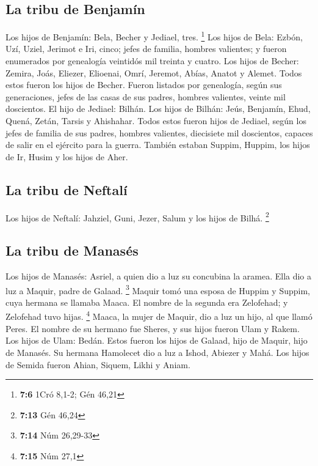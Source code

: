 \begin{paracol}{2}
\hypertarget{la-tribu-de-benjamuxedn}{%
\subsection{La tribu de Benjamín}\label{la-tribu-de-benjamuxedn}}

 Los hijos de Benjamín: Bela, Becher y Jediael, tres.
\footnote{\textbf{7:6} 1Cró 8,1-2; Gén 46,21}  Los hijos
de Bela: Ezbón, Uzí, Uziel, Jerimot e Iri, cinco; jefes de familia,
hombres valientes; y fueron enumerados por genealogía veintidós mil
treinta y cuatro.  Los hijos de Becher: Zemira, Joás,
Eliezer, Elioenai, Omrí, Jeremot, Abías, Anatot y Alemet. Todos estos
fueron los hijos de Becher.  Fueron listados por
genealogía, según sus generaciones, jefes de las casas de sus padres,
hombres valientes, veinte mil doscientos.  El hijo de
Jediael: Bilhán. Los hijos de Bilhán: Jeús, Benjamín, Ehud, Quená,
Zetán, Tarsis y Ahishahar.  Todos estos fueron hijos de
Jediael, según los jefes de familia de sus padres, hombres valientes,
diecisiete mil doscientos, capaces de salir en el ejército para la
guerra.  También estaban Suppim, Huppim, los hijos de Ir,
Husim y los hijos de Aher.

\hypertarget{la-tribu-de-neftaluxed}{%
\subsection{La tribu de Neftalí}\label{la-tribu-de-neftaluxed}}

 Los hijos de Neftalí: Jahziel, Guni, Jezer, Salum y los
hijos de Bilhá. \footnote{\textbf{7:13} Gén 46,24}

\hypertarget{la-tribu-de-manasuxe9s}{%
\subsection{La tribu de Manasés}\label{la-tribu-de-manasuxe9s}}

 Los hijos de Manasés: Asriel, a quien dio a luz su
concubina la aramea. Ella dio a luz a Maquir, padre de Galaad.
\footnote{\textbf{7:14} Núm 26,29-33}  Maquir tomó una
esposa de Huppim y Suppim, cuya hermana se llamaba Maaca. El nombre de
la segunda era Zelofehad; y Zelofehad tuvo hijas. \footnote{\textbf{7:15}
  Núm 27,1}  Maaca, la mujer de Maquir, dio a luz un
hijo, al que llamó Peres. El nombre de su hermano fue Sheres, y sus
hijos fueron Ulam y Rakem.  Los hijos de Ulam: Bedán.
Estos fueron los hijos de Galaad, hijo de Maquir, hijo de Manasés.
 Su hermana Hamolecet dio a luz a Ishod, Abiezer y Mahá.
 Los hijos de Semida fueron Ahian, Siquem, Likhi y Aniam.


\end{paracol}
